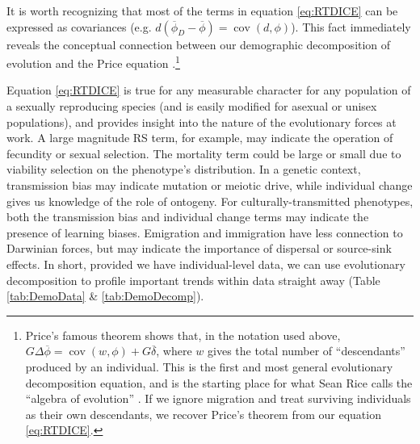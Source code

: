 \documentclass[11pt]{article}
\DeclareMathOperator{\cov}{cov}
\begin{document}
It is worth recognizing that most of the terms in equation \ref{eq:RTDICE} can be expressed as covariances (e.g. $d(\overline{\phi}_D - \overline{\phi}) = \cov(d,\phi)$).  This fact immediately reveals the conceptual connection between our demographic decomposition of evolution and the Price equation \citep{price1970selection}.\footnote{Price's famous theorem shows that, in the notation used above, $G \Delta \overline{\phi} = \cov(w, \phi) + G\overline{\delta}$, where $w$ gives the total number of ``descendants'' produced by an individual.  This is the first and most general evolutionary decomposition equation, and is the starting place for what Sean Rice calls the ``algebra of evolution'' \citep{rice2004evolutionary}. If we ignore migration and treat surviving individuals as their own descendants, we recover Price's theorem from our equation \ref{eq:RTDICE}.}

Equation \ref{eq:RTDICE} is true for any measurable character for any population of a sexually reproducing species (and is easily modified for asexual or unisex populations), and provides insight into the nature of the evolutionary forces at work.  A large magnitude RS term, for example, may indicate the operation of fecundity or sexual selection.  The mortality term could be large or small due to viability selection on the phenotype's distribution.  In a genetic context, transmission bias may indicate mutation or meiotic drive, while individual change gives us knowledge of the role of ontogeny.  For culturally-transmitted phenotypes, both the transmission bias and individual change terms may indicate the presence of learning biases.  Emigration and immigration have less connection to Darwinian forces, but may indicate the importance of dispersal or source-sink effects.  In short, provided we have individual-level data, we can use evolutionary decomposition to profile important trends within data straight away (Table \ref{tab:DemoData} \& \ref{tab:DemoDecomp}).  
\end{document}
